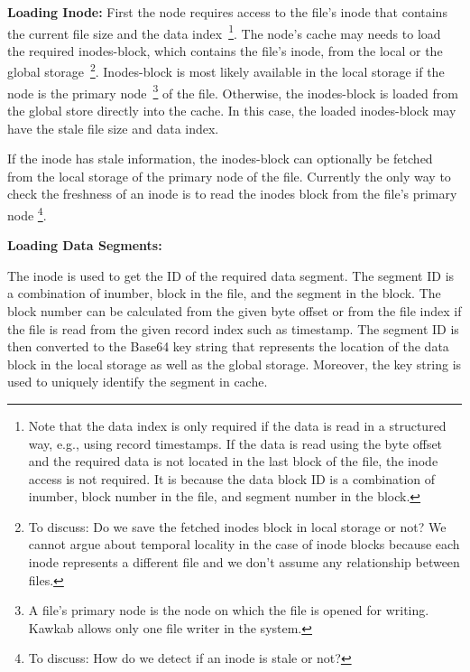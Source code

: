 \documentclass[]{article}
\newcommand{\subtopic}[1]{\vspace{1.5pt} \noindent \textbf{#1}}
\newcommand{\hl}[1]{\textcolor{hlcolor}{#1}}
\begin{document}
\subtopic{Loading Inode:} First the node requires access to the file's inode
that contains the current file size and the data index~\footnote{Note that the
data index is only required if the data is read in a structured way, e.g.,
using record timestamps. If the data is read using the byte offset and the
required data is not located in the last block of the file, the inode access is
not required. It is because the data block ID is a combination of inumber,
block number in the file, and segment number in the block.}.  The node's cache
may needs to load the required inodes-block, which contains the file's inode,
from the local or the global storage~\footnote{\hl{To discuss: Do we save the
fetched inodes block in local storage or not? We cannot argue about temporal
locality in the case of inode blocks because each inode represents a different
file and we don't assume any relationship between files.}}.  Inodes-block is
most likely available in the local storage if the node is the primary
node~\footnote{A file's primary node is the node on which the file is opened
for writing. Kawkab allows only one file writer in the system.} of the file.
Otherwise, the inodes-block is loaded from the global store directly into the
cache. In this case, the loaded inodes-block may have the stale file size and
data index. 

If the inode has stale information, the inodes-block can optionally
be fetched from the local storage of the primary node of the file. Currently
the only way to check the freshness of an inode is to read the inodes block
from the file's primary node
\footnote{\hl{To discuss: How do we detect if an inode is stale or not?}}.






\subtopic{Loading Data Segments:}

The inode is used to get the ID of the required data segment. The segment ID is
a combination of inumber, block in the file, and the segment in the block. The
block number can be calculated from the given byte offset or from the file
index if the file is read from the given record index such as timestamp. The
segment ID is then converted to the Base64 key string that represents the
location of the data block in the local storage as well as the global storage.
Moreover, the key string is used to uniquely identify the segment in cache.
\end{document}
